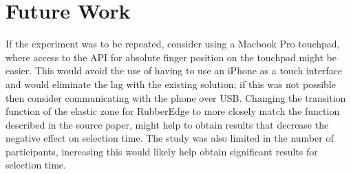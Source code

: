 \section{Future Work}\label{futureWork}
If the experiment was to be repeated, consider using a Macbook Pro touchpad, where access to the \gls{API} for absolute finger position on the touchpad might be easier. This would avoid the use of having to use an iPhone as a touch interface and would eliminate the lag with the existing solution; if this was not possible then consider communicating with the phone over USB. Changing the transition function of the elastic zone for RubberEdge to more closely match the function described in the source paper\cite{Casiez2007RubberEdge}, might help to obtain results that decrease the negative effect on selection time. The study was also limited in the number of participants, increasing this would likely help obtain significant results for selection time.